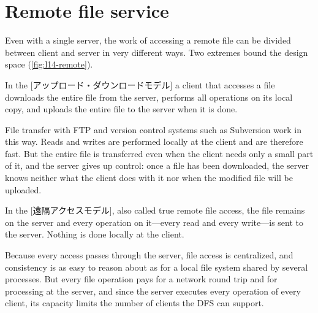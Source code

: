 \documentclass[../main.tex]{subfiles}
\begin{document}
\section{Remote file service}
\label{sec:l14-remote}

Even with a single server, the work of accessing a remote file can be
divided between client and server in very different ways.  Two extremes bound the design space
(\cref{fig:l14-remote}).

\begin{definition}
  In the [アップロード・ダウンロードモデル] a
  client that accesses a file downloads the entire file from the server,
  performs all operations on its local copy, and uploads the entire file to
  the server when it is done.
\end{definition}

File transfer with FTP and version control systems such as Subversion work
in this way.  Reads and writes are performed locally at the client and
are therefore fast.  But the entire file is transferred even when the
client needs only a small part of it, and the server gives up control: once
a file has been downloaded, the server knows neither what the client does
with it nor when the modified file will be uploaded.

\begin{definition}
  In the [遠隔アクセスモデル], also called true
  remote file access, the file remains on the server and every operation on
  it---every read and every write---is sent to the server.  Nothing is done
  locally at the client.
\end{definition}

Because every access passes through the server, file access is
centralized, and consistency is as easy to reason about as for a local
file system shared by several processes.  But every file operation pays
for a network round trip and for processing at the server, and since the
server executes every operation of every client, its capacity limits the
number of clients the DFS can support.
\end{document}
